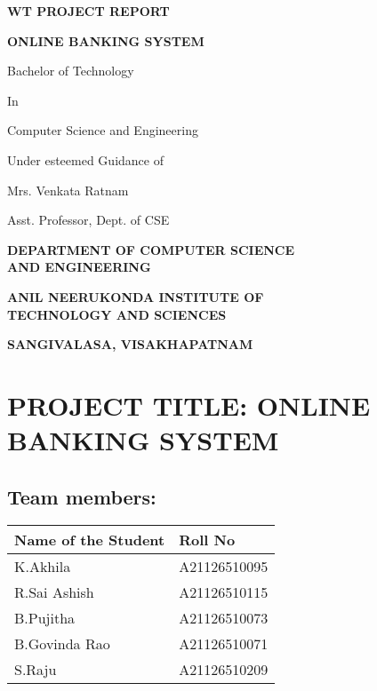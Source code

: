 \documentclass{report}
\begin{document}
\begin{titlepage}
\centering
{\LARGE\bfseries WT PROJECT REPORT\par}
\vspace{1cm}
{\huge\bfseries ONLINE BANKING SYSTEM\par}
\vspace{1.5cm}
{\Large Bachelor of Technology\par}
\vspace{0.5cm}
{\Large In\par}
\vspace{0.5cm}
{\Large Computer Science and Engineering\par}
\vspace{1.5cm}
{\Large Under esteemed Guidance of\par}
\vspace{0.5cm}
{\Large Mrs. Venkata Ratnam\par}
{\Large Asst. Professor, Dept. of CSE\par}
\vspace{1.5cm}
{\Large\bfseries DEPARTMENT OF COMPUTER SCIENCE\\AND ENGINEERING\par}
\vspace{0.5cm}
{\Large\bfseries ANIL NEERUKONDA INSTITUTE OF\\TECHNOLOGY AND SCIENCES\par}
\vspace{0.5cm}
{\Large\bfseries SANGIVALASA, VISAKHAPATNAM\par}
\end{titlepage}

\chapter*{PROJECT TITLE: ONLINE BANKING SYSTEM}

\section*{Team members:}
\begin{tabular}{|l|l|}
\hline
\textbf{Name of the Student} & \textbf{Roll No} \\
\hline
K.Akhila & A21126510095 \\
\hline
R.Sai Ashish & A21126510115 \\
\hline
B.Pujitha & A21126510073 \\
\hline
B.Govinda Rao & A21126510071 \\
\hline
S.Raju & A21126510209 \\
\hline
\end{tabular}
\end{document}
